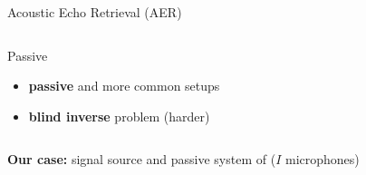 \begin{frame}[t]{Acoustic Echo Retrieval (AER) \hfill\faPalette}
\begin{columns}[T,onlytextwidth]
{\begin{block}{Passive}
                \vspace{-2mm}
                \begin{itemize}
                    \small
                    \item \textbf{passive} and more common setups
                    \item[\faSun] \textbf{blind inverse} problem (harder)
                    \\\hspace{-1em}
                \end{itemize}
            \end{block}
            }

    \end{columns}

    \vfill
    \textcolor{myred}{\textbf{Our case:} signal source and passive system of ($I$ microphones)}

\end{frame}

